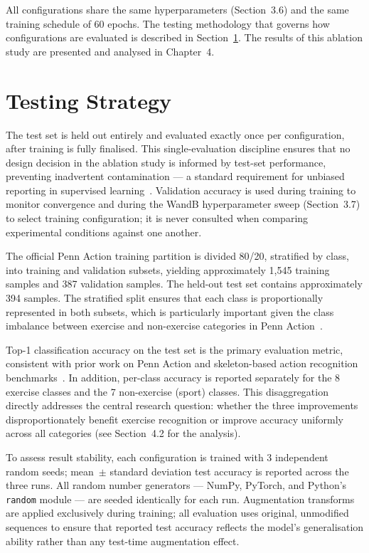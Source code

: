 All configurations share the same hyperparameters (Section~3.6) and the same training schedule of 60 epochs. The testing methodology that governs how configurations are evaluated is described in Section~\ref{sec:testing-strategy}. The results of this ablation study are presented and analysed in Chapter~4.

\section{Testing Strategy}
\label{sec:testing-strategy}

The test set is held out entirely and evaluated exactly once per configuration, after training is fully finalised. This single-evaluation discipline ensures that no design decision in the ablation study is informed by test-set performance, preventing inadvertent contamination --- a standard requirement for unbiased reporting in supervised learning~\cite{yan2018spatial}. Validation accuracy is used during training to monitor convergence and during the WandB hyperparameter sweep (Section~3.7) to select training configuration; it is never consulted when comparing experimental conditions against one another.

The official Penn Action training partition is divided 80/20, stratified by class, into training and validation subsets, yielding approximately 1,545 training samples and 387 validation samples. The held-out test set contains approximately 394 samples. The stratified split ensures that each class is proportionally represented in both subsets, which is particularly important given the class imbalance between exercise and non-exercise categories in Penn Action~\cite{zhang2013actemes}.

Top-1 classification accuracy on the test set is the primary evaluation metric, consistent with prior work on Penn Action and skeleton-based action recognition benchmarks~\cite{yan2018spatial, shi2019two}. In addition, per-class accuracy is reported separately for the 8 exercise classes and the 7 non-exercise (sport) classes. This disaggregation directly addresses the central research question: whether the three improvements disproportionately benefit exercise recognition or improve accuracy uniformly across all categories (see Section~4.2 for the analysis).

To assess result stability, each configuration is trained with 3 independent random seeds; mean~$\pm$ standard deviation test accuracy is reported across the three runs. All random number generators --- NumPy, PyTorch, and Python's \texttt{random} module --- are seeded identically for each run. Augmentation transforms are applied exclusively during training; all evaluation uses original, unmodified sequences to ensure that reported test accuracy reflects the model's generalisation ability rather than any test-time augmentation effect.

